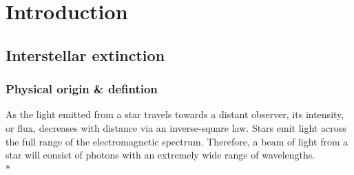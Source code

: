 \documentclass[12pt, a4paper]{report}
\begin{document}
\chapter{Introduction}
\section{Interstellar extinction} \label{ext_def}
\subsection{Physical origin \& defintion} \label{phys_origin}
As the light emitted from a star travels towards a distant observer, its intensity, or flux, decreases with distance via an inverse-square law. Stars emit light across the full range of the electromagnetic spectrum. Therefore, a beam of light from a star will consist of photons with an extremely wide range of wavelengths. \\*




\end{document}
